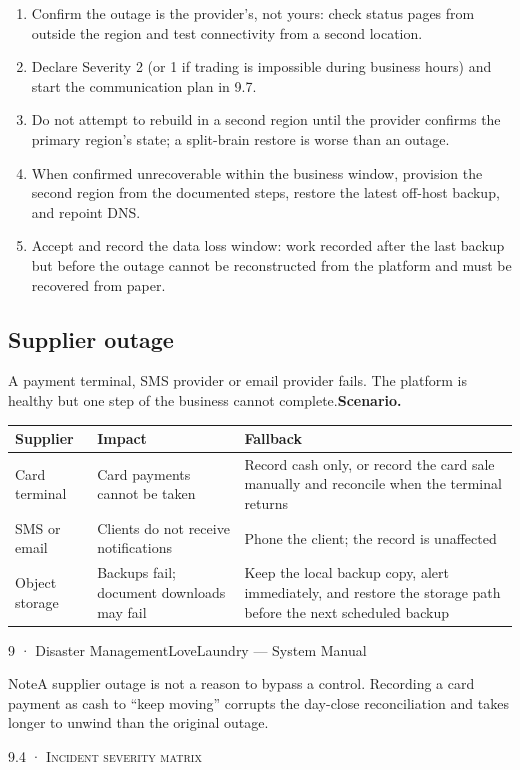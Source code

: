 \documentclass[11pt,a4paper,oneside]{book}
\begin{document}
\begin{enumerate}
\item Confirm the outage is the provider's, not yours: check status pages from outside the region and test connectivity from a second location.
\item Declare Severity 2 (or 1 if trading is impossible during business hours) and start the communication plan in 9.7.
\item Do not attempt to rebuild in a second region until the provider confirms the primary region's state; a split-brain restore is worse than an outage.
\item When confirmed unrecoverable within the business window, provision the second region from the documented steps, restore the latest off-host backup, and repoint DNS.
\item Accept and record the data loss window: work recorded after the last backup but before the outage cannot be reconstructed from the platform and must be recovered from paper.
\end{enumerate}
\subsection*{Supplier outage}
A payment terminal, SMS provider or email provider fails. The platform is healthy but one step of the business cannot complete.\textbf{Scenario.}

\begin{center}\small
\begin{tabularx}{\linewidth}{|X|X|X|}
\hline
\rowcolor{lightgrey}
\textbf{Supplier} & \textbf{Impact} & \textbf{Fallback} \\ \hline
Card terminal & Card payments cannot be taken & Record cash only, or record the card sale manually and reconcile when the terminal returns \\ \hline
SMS or email & Clients do not receive notifications & Phone the client; the record is unaffected \\ \hline
Object storage & Backups fail; document downloads may fail & Keep the local backup copy, alert immediately, and restore the storage path before the next scheduled backup \\ \hline
\end{tabularx}
\end{center}
9 · Disaster ManagementLoveLaundry — System Manual

\begin{notebox}NoteA supplier outage is not a reason to bypass a control. Recording a card payment as cash to “keep moving” corrupts the day-close reconciliation and takes longer to unwind than the original outage.\end{notebox}
\textsc{\small\color{crimson}9.4 · Incident severity matrix}\par\medskip
\end{document}
